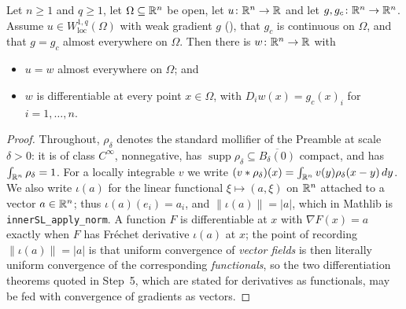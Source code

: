 \begin{lemma}
Let $n\ge1$ and $q\ge1$, let $\Omega\subseteq\mathbb{R}^n$ be open, let
$u\colon\mathbb{R}^n\to\mathbb{R}$ and let $g,g_c\colon\mathbb{R}^n\to\mathbb{R}^n$.  Assume
$u\in W^{1,q}_{\mathrm{loc}}(\Omega)$ with weak gradient $g$
(), that $g_c$ is continuous on $\Omega$, and that
$g=g_c$ almost everywhere on $\Omega$.  Then there is $w\colon\mathbb{R}^n\to\mathbb{R}$ with
\begin{itemize}
\item[(a)] $u=w$ almost everywhere on $\Omega$; and
\item[(b)] $w$ is differentiable at every point $x\in\Omega$, with
  $D_iw(x)=g_c(x)_i$ for $i=1,\dots,n$.
\end{itemize}
\end{lemma}
\begin{proof}
Throughout, $\rho_\delta$ denotes the standard mollifier of the Preamble at
scale $\delta>0$: it is of class $C^\infty$, nonnegative, has
$\operatorname{supp}\rho_\delta\subseteq\overline{B_\delta(0)}$ compact, and has
$\int_{\mathbb{R}^n}\rho_\delta=1$.  For a locally integrable $v$ we write
$(v*\rho_\delta)(x)=\int_{\mathbb{R}^n}v(y)\rho_\delta(x-y)\,dy$.  We also write
$\iota(a)$ for the linear functional $\xi\mapsto(a,\xi)$ on $\mathbb{R}^n$ attached to a
vector $a\in\mathbb{R}^n$; thus $\iota(a)(e_i)=a_i$, and $\|\iota(a)\|=|a|$, which in
Mathlib is \texttt{innerSL\_apply\_norm}.  A function $F$ is differentiable at
$x$ with $\nabla F(x)=a$ exactly when $F$ has Fr\'echet derivative $\iota(a)$ at
$x$; the point of recording $\|\iota(a)\|=|a|$ is that uniform convergence of
\emph{vector fields} is then literally uniform convergence of the corresponding
\emph{functionals}, so the two differentiation theorems quoted in Step~5, which
are stated for derivatives as functionals, may be fed with convergence of
gradients as vectors.


\end{proof}
